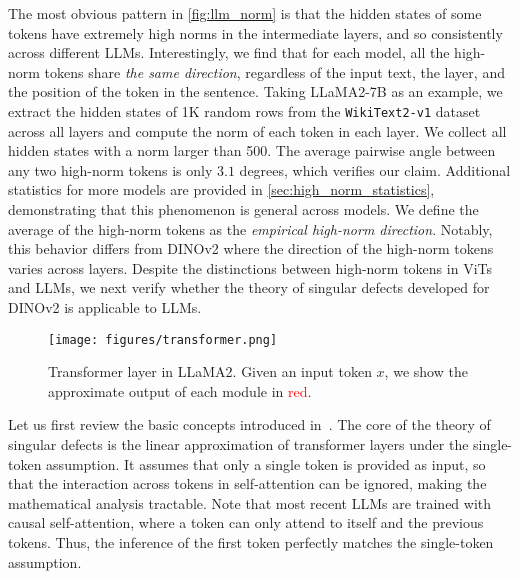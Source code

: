 The most obvious pattern in \cref{fig:llm_norm} is that the hidden states of some tokens have extremely high norms in the intermediate layers, and so consistently across different LLMs.
Interestingly, we find that for each model, all the high-norm tokens share \emph{the same direction}, regardless of the input text, the layer, and the position of the token in the sentence.
Taking LLaMA2-7B as an example, we extract the hidden states of 1K random rows from the \texttt{WikiText2-v1} dataset~\cite{merity2017pointer} across all layers and compute the norm of each token in each layer.
We collect all hidden states with a norm larger than 500.
The average pairwise angle between any two high-norm tokens is only \(3.1\) degrees, which verifies our claim.
Additional statistics for more models are provided in \cref{sec:high_norm_statistics}, demonstrating that this phenomenon is general across models.
We define the average of the high-norm tokens as the \emph{empirical high-norm direction}.
Notably, this behavior differs from DINOv2 where the direction of the high-norm tokens varies across layers.
Despite the distinctions between high-norm tokens in ViTs and LLMs, we next verify whether the theory of singular defects developed for DINOv2 is applicable to LLMs.

\begin{figure}[t]
    \centering
    \texttt{[image: figures/transformer.png]}
    \vspace{-0.5em}
    \caption{Transformer layer in LLaMA2.
        Given an input token \(x\), we show the approximate output of each module in \textcolor{red}{red}.
    }\label{fig:transformer}
    \vspace{-0.5em}
\end{figure}
Let us first review the basic concepts introduced in~\cite{wang2024sinder}.
The core of the theory of singular defects is the linear approximation of transformer layers under the single-token assumption.
It assumes that only a single token is provided as input, so that the interaction across tokens in self-attention can be ignored, making the mathematical analysis tractable.
Note that most recent LLMs are trained with causal self-attention, where a token can only attend to itself and the previous tokens.
Thus, the inference of the first token perfectly matches the single-token assumption.

